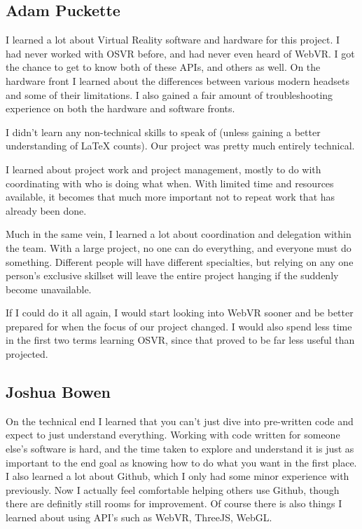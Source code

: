 \documentclass[draftclsnofoot,onecolumn]{IEEEtran}
\begin{document}
\subsection{Adam Puckette}

I learned a lot about Virtual Reality software and hardware for this project. 
I had never worked with OSVR before, and had never even heard of WebVR. 
I got the chance to get to know both of these APIs, and others as well. 
On the hardware front I learned about the differences between various modern headsets and some of their limitations. 
I also gained a fair amount of troubleshooting experience on both the hardware and software fronts.

I didn’t learn any non-technical skills to speak of (unless gaining a better understanding of LaTeX counts). Our project was pretty much entirely technical.

I learned about project work and project management, mostly to do with coordinating with who is doing what when. 
With limited time and resources available, it becomes that much more important not to repeat work that has already been done. 

Much in the same vein, I learned a lot about coordination and delegation within the team. 
With a large project, no one can do everything, and everyone must do something. 
Different people will have different specialties, but relying on any one person's exclusive skillset will leave the entire project hanging if the suddenly become unavailable. 

If I could do it all again, I would start looking into WebVR sooner and be better prepared for when the focus of our project changed. 
I would also spend less time in the first two terms learning OSVR, since that proved to be far less useful than projected.  

\subsection{Joshua Bowen}

On the technical end I learned that you can't just dive into pre-written code and expect to just understand everything.
Working with code written for someone else's software is hard, and the time taken to explore and understand it is just as important to the end goal as knowing how to do what you want in the first place.
I also learned a lot about Github, which I only had some minor experience with previously.
Now I actually feel comfortable helping others use Github, though there are definitly still rooms for improvement.
Of course there is also things I learned about using API's such as WebVR, ThreeJS, WebGL.
\end{document}
